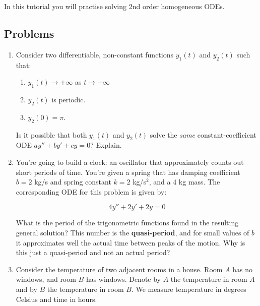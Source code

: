 \begin{objectives}
	In this tutorial you will practise solving 2nd order homogeneous ODEs.
\end{objectives}

\vspace{-.5em}
\subsection*{Problems}
\vspace{-.5em}






\begin{enumerate}
	\item Consider two differentiable, non-constant functions $y_1(t)$ and $y_2(t)$ such that:
    \begin{enumerate}[label=(\roman*)]
        \item $y_1(t) \rightarrow +\infty$ as $t \rightarrow +\infty$
        \item $y_2(t)$ is periodic.
        \item $y_2(0) = \pi$.
    \end{enumerate}

    Is it possible that both $y_1(t)$ and $y_2(t)$ solve the \textit{same} constant-coefficient ODE $ay'' + by' + cy = 0$? Explain.

    \item You're going to build a clock: an oscillator that approximately counts out short periods of time.
    You're given a spring that has damping coefficient $b=2$ kg/s and spring constant $k=2$ kg/s$^2$, and a $4$ kg mass. The corresponding ODE for this problem is given by:
    
    \[
        4y'' + 2y' + 2y = 0
    \]
    
    What is the period of the trigonometric functions found in the resulting general solution? This number is the \textbf{quasi-period}, and for small values of $b$ it approximates well the actual time between peaks of the motion. Why is this just a quasi-period and not an actual period?

    \item 
    Consider the temperature of two adjacent rooms in a house. Room $A$ has no windows, and room $B$ has windows. Denote by $A$ the temperature in room $A$ and by $B$ the temperature in room $B$. We measure temperature in degrees Celsius and time in hours.
    

\end{enumerate}
